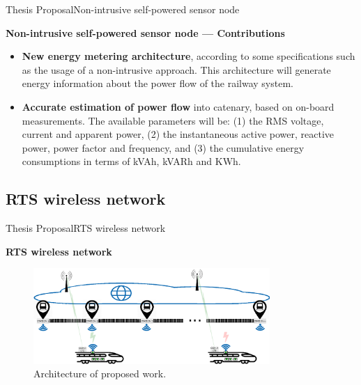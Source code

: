 \begin{frame}{Thesis Proposal}{Non-intrusive self-powered sensor node}
\begin{block}{\textbf{Non-intrusive self-powered sensor node --- Contributions}}
		\begin{itemize}
			\item \textbf{New energy metering architecture}, according to some specifications such as the usage of a non-intrusive approach.
			This architecture will generate energy information about the power flow of the railway system.
			
			\item \textbf{Accurate estimation of power flow} into catenary, based on on-board measurements. The available parameters will be: (1) the RMS voltage, current and apparent power, (2) the instantaneous active power, reactive power, power factor and frequency, and (3) the cumulative energy consumptions in terms of kVAh, kVARh and KWh.
		\end{itemize}
\end{block}
\end{frame}


\subsection{RTS wireless network}


\begin{frame}{Thesis Proposal}{RTS wireless network}
\begin{block}{\textbf{RTS wireless network}}
\begin{figure}[ht!]
	\centering
	\includegraphics[width=0.8\textwidth,keepaspectratio]{figures/40.Method/architecture}
	\caption{Architecture of proposed work.}
\end{figure}
\end{block}
\end{frame}

